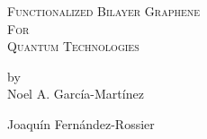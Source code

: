 \begin{titlepage}

\begin{center}

\begingroup \linespread{1,75} \selectfont
\textsc{\LARGE Functionalized Bilayer Graphene\\
For\\
Quantum Technologies}\\[1,5cm]
\endgroup


by\\[0,5cm]
Noel A. García-Martínez\\[2,5cm]


\end{center}

Joaquín Fernández-Rossier

\vfill

\end{titlepage}
